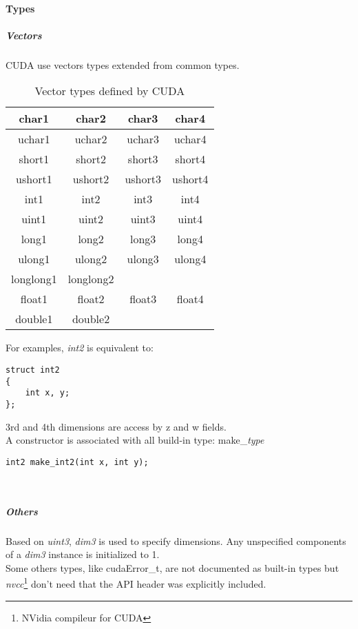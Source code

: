 				\paragraph{Types}
			
					\subparagraph{Vectors}
					
CUDA use vectors types extended from common types.
\begin{table}[!h]
	\caption{Vector types defined by CUDA}
	\center
	\begin{tabular}{|c|c|c|c|} \hline
	char1 & char2 & char3 & char4 \\\hline
	uchar1 & uchar2 & uchar3 & uchar4 \\\hline
	short1 & short2 & short3 & short4 \\\hline
	ushort1 & ushort2 & ushort3 & ushort4 \\\hline
	int1 & int2 & int3 & int4 \\\hline
	uint1 & uint2 & uint3 & uint4 \\\hline
	long1 & long2 & long3 & long4 \\\hline
	ulong1 & ulong2 & ulong3 & ulong4 \\\hline
	longlong1 & longlong2 &  & \\\hline
	float1 & float2 & float3 & float4 \\\hline
	double1 & double2 &  & \\\hline
	\end{tabular}
	\label{heterogeneous:tabCudaVector}
\end{table}

For examples, \emph{int2} is equivalent to:
\begin{verbatim}struct int2
{
	int x, y;
};\end{verbatim}
3rd and 4th dimensions are access by z and w fields.\\

A constructor is associated with all build-in type: make\_\emph{type}
\begin{verbatim}int2 make_int2(int x, int y);\end{verbatim}\\
			
					\subparagraph{Others}

Based on \emph{uint3}, \emph{dim3} is used to specify dimensions. Any unspecified components of a \emph{dim3} instance is initialized to 1.\\

Some others types, like cudaError\_t, are not documented as built-in types but \emph{nvcc}\footnote{NVidia compileur for CUDA} don't need that the 
API header was explicitly included.


